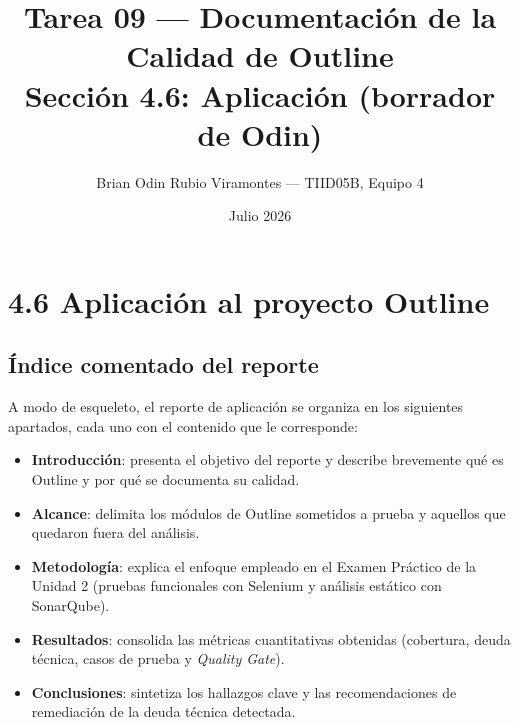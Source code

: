 \documentclass[11pt,letterpaper]{article}
\title{Tarea 09 --- Documentaci\'on de la Calidad de Outline\\[2pt]
       \large Secci\'on 4.6: Aplicaci\'on (borrador de Odin)}
\author{Brian Odin Rubio Viramontes --- TIID05B, Equipo 4}
\date{Julio 2026}
\begin{document}
\maketitle


\section*{4.6 Aplicaci\'on al proyecto Outline}

\subsection*{\'Indice comentado del reporte}

A modo de esqueleto, el reporte de aplicaci\'on se organiza en los siguientes
apartados, cada uno con el contenido que le corresponde:

\begin{itemize}
  \item \textbf{Introducci\'on}: presenta el objetivo del reporte y describe
        brevemente qu\'e es Outline y por qu\'e se documenta su calidad.
  \item \textbf{Alcance}: delimita los m\'odulos de Outline sometidos a prueba
        y aquellos que quedaron fuera del an\'alisis.
  \item \textbf{Metodolog\'ia}: explica el enfoque empleado en el Examen
        Pr\'actico de la Unidad 2 (pruebas funcionales con Selenium y
        an\'alisis est\'atico con SonarQube).
  \item \textbf{Resultados}: consolida las m\'etricas cuantitativas obtenidas
        (cobertura, deuda t\'ecnica, casos de prueba y \textit{Quality Gate}).
  \item \textbf{Conclusiones}: sintetiza los hallazgos clave y las
        recomendaciones de remediaci\'on de la deuda t\'ecnica detectada.
\end{itemize}
\end{document}
